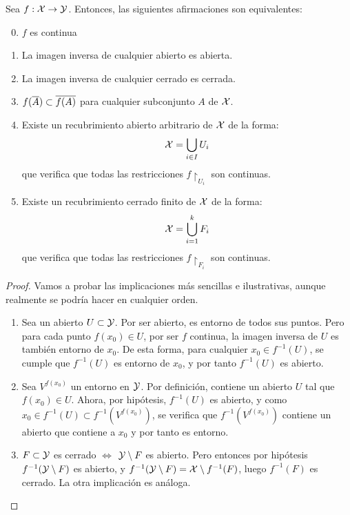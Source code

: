 \begin{prop}
	Sea $f:\mathcal{X}\to\mathcal{Y}$. Entonces, las siguientes afirmaciones son equivalentes:
	
	\begin{enumerate}
		\setcounter{enumi}{-1}
		\item $f$ es continua
		\item La imagen inversa de cualquier abierto es abierta.
		\item La imagen inversa de cualquier cerrado es cerrada.
		\item $f(\overline{A})\subset\overline{f(A)}$ para cualquier subconjunto $A$ de $\mathcal{X}$.
		\item Existe un recubrimiento abierto arbitrario de $\mathcal{X}$ de la forma:
			\[\mathcal{X}=\bigcup\limits_{i\in I} U_i\]
			que verifica que todas las restricciones $f\restriction_{U_i}$ son continuas.
		\item Existe un recubrimiento cerrado finito de $\mathcal{X}$ de la forma:
			\[\mathcal{X}=\bigcup\limits_{i=1}^k F_i\]
			que verifica que todas las restricciones $f\restriction_{F_i}$ son continuas.
	\end{enumerate}

	\begin{proof}
		Vamos a probar las implicaciones más sencillas e ilustrativas, aunque realmente se podría hacer en cualquier orden. 
		
		\begin{enumerate}[align=left, leftmargin=*]
			\item[\fbox{$(0)\implies (1)$}] Sea un abierto $U\subset\mathcal{Y}$. Por ser abierto, es entorno de todos sus puntos. Pero para cada punto $f(x_0)\in U$, por ser $f$ continua, la imagen inversa de $U$ es también entorno de $x_0$. De esta forma, para cualquier $x_0\in f^{-1}(U)$, se cumple que $f^{-1}(U)$ es entorno de $x_0$, y por tanto $f^{-1}(U)$ es abierto.
			
			\item[\fbox{$(1)\implies (0)$}] Sea $V^{f(x_0)}$ un entorno en $\mathcal{Y}$. Por definición, contiene un abierto $U$ tal que $f(x_0)\in U$. Ahora, por hipótesis, $f^{-1}(U)$ es abierto, y como $x_0\in f^{-1}(U)\subset f^{-1}(V^{f(x_0)})$, se verifica que $f^{-1}(V^{f(x_0)})$ contiene un abierto que contiene a $x_0$ y por tanto es entorno.
			
			\item[\fbox{$(1)\Longleftrightarrow (2)$}] $F\subset\mathcal{Y}$ es cerrado $\iff$ $\mathcal{Y}\setminus F$ es abierto. Pero entonces por hipótesis $f^{-1}(\mathcal{Y}\setminus F)$ es abierto, y $f^{-1}(\mathcal{Y}\setminus F)=\mathcal{X}\setminus f^{-1}(F)$, luego $f^{-1}(F)$ es cerrado. La otra implicación es análoga.
			

\end{enumerate}
\end{proof}
\end{prop}
